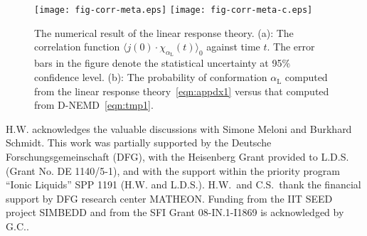 \documentclass[journal=jctcce,manuscript=manuscript]{achemso}
\newcommand{\confc}[0]{{\alpha_{\textrm{L}}}}
\begin{document}
\begin{figure}
  \centering
  \texttt{[image: fig-corr-meta.eps]}
  \texttt{[image: fig-corr-meta-c.eps]}
  \caption{
    {The numerical result of the linear response theory.
    (a): The correlation function $\langle j(0)\cdot \chi_{\confc}(t)
    \rangle_0$ against time $t$.
    The error bars in the figure denote
    the statistical uncertainty at 95\% confidence level. 
    (b): The probability of conformation $\confc$ computed from the
    linear response theory~\eqref{eqn:appdx1} versus that
    computed from D-NEMD~\eqref{eqn:tmp1}.}
  }
  \label{fig:appdx1}
\end{figure}



\begin{acknowledgement}

  H.W. acknowledges the valuable discussions with Simone Meloni and Burkhard Schmidt.
  This work was partially supported by the Deutsche
  Forschungsgemeinschaft (DFG), with the Heisenberg
  Grant provided to L.D.S. (Grant No. DE 1140/5-1),
  and with the support within the priority program ``Ionic Liquids'' SPP 1191
  (H.W. and L.D.S.). 
  H.W.~and C.S.~thank the financial support by DFG research center MATHEON.
  Funding from the IIT SEED project SIMBEDD and from the SFI Grant 08-IN.1-I1869 is acknowledged by G.C..
\end{acknowledgement}





\end{document}
